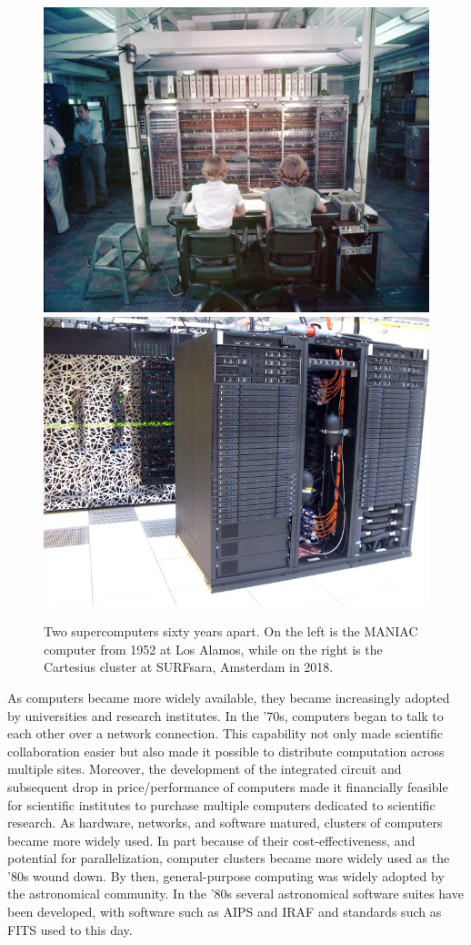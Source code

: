 \begin{figure}[h]
\includegraphics[width=.45\linewidth]{background/figures/Maniac_1952.jpg}\quad\includegraphics[width=.45\linewidth]{background/figures/cartesius.jpeg}
    \caption[Two supercomputers sixty years apart.]{Two supercomputers sixty years apart. On the left is the MANIAC computer from 1952 at Los Alamos, while on the right is the Cartesius cluster at SURFsara, Amsterdam in 2018.}
    \label{fig:intro_supercomputers}

\end{figure}

As computers became more widely available, they became increasingly adopted by universities and research institutes. In the '70s, computers began to talk to each other over a network connection. This capability not only made scientific collaboration easier but also made it possible to distribute computation across multiple sites. Moreover, the development of the integrated circuit and subsequent drop in price/performance of computers made it financially feasible for scientific institutes to purchase multiple computers dedicated to scientific research. As hardware, networks, and software matured, clusters of computers became more widely used\citep{tel_2000}. In part because of their cost-effectiveness, and potential for parallelization, computer clusters became more widely used as the '80s wound down. By then, general-purpose computing was widely adopted by the astronomical community. In the '80s several astronomical software suites have been developed, with software such as AIPS\citep{AIPS_NRAO} and IRAF\citep{iraf} and standards such as FITS\citep{1979fits} used to this day. 

